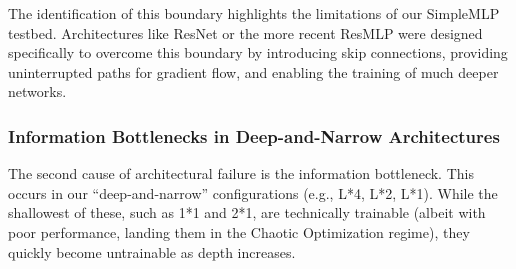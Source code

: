 \documentclass[conference]{IEEEtran}
\begin{document}
\begin{table}[h!]
\centering
\caption{Performance Collapse at the VGP Boundary (n=10).}
\label{tab:20v21_results}
\end{table}

The identification of this boundary highlights the limitations of our SimpleMLP testbed. Architectures like ResNet\cite{b8} or the more recent ResMLP\cite{b9} were designed specifically to overcome this boundary by introducing skip connections, providing uninterrupted paths for gradient flow, and enabling the training of much deeper networks.

\subsubsection{Information Bottlenecks in Deep-and-Narrow Architectures}

The second cause of architectural failure is the information bottleneck. This occurs in our ``deep-and-narrow'' configurations (e.g., L*4, L*2, L*1). While the shallowest of these, such as 1*1 and 2*1, are technically trainable (albeit with poor performance, landing them in the Chaotic Optimization regime), they quickly become untrainable as depth increases.
\end{document}
